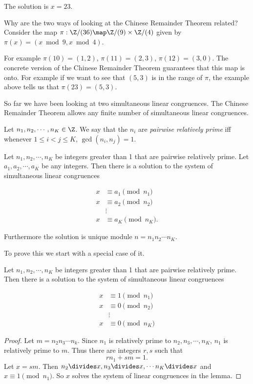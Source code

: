 \documentclass[oneside,12pt]{amsart}
\begin{document}
The solution is $x=23$.

\bigskip

Why are the two ways of looking at the Chinese Remainder Theorem related? Consider
the map $\pi:\Z/(36) \map \Z/(9)\times\Z/(4)$ given by $\pi(x) = \left(x\bmod 9, x\bmod 4 \right)$.

For example $\pi(10) = (1,2)$, $\pi(11) = (2,3)$, $\pi(12) = (3, 0)$. The concrete version of the
Chinese Remainder Theorem guarantees that this map is onto. For example if we want to see that
$(5,3)$ is in the range of $\pi$, the example above tells us that $\pi(23) = (5,3)$.

\bigskip

So far we have been looking at two simultaneous linear congruences.
The Chinese Remainder Theorem allows any finite number of simultaneous linear congruences.

\begin{definition}
Let $n_1,n_2,\cdots,n_K\in\Z$. We say that the $n_i$ are \emph{pairwise relatively prime}
iff whenever $1\leq i < j \leq K$, $\gcd(n_i,n_j) = 1$.
\end{definition}

\begin{theorem} Let $n_1,n_2,\cdots,n_K$ be integers greater
than 1 that are pairwise relatively prime. Let $a_1,a_2,\cdots,a_K$ be any integers. Then there is a solution to the
system of simultaneous linear congruences

\begin{align*}
x &\equiv a_1 \pmod{n_1} \\
x &\equiv a_2 \pmod{n_2} \\
  &\vdots \\
x &\equiv a_K \pmod{n_K}.
\end{align*}

Furthermore the solution is unique module $n=n_1 n_2 \cdots n_K$.

\end{theorem}

To prove this we start with a special case of it.

\begin{lemma} Let $n_1,n_2,\cdots,n_K$ be integers greater
than 1 that are pairwise relatively prime. Then there is a solution to the
system of simultaneous linear congruences

\begin{align*}
x &\equiv 1 \pmod{n_1} \\
x &\equiv 0 \pmod{n_2} \\
  &\vdots \\
x &\equiv 0 \pmod{n_K}
\end{align*}

\end{lemma}
\begin{proof}
Let $m = n_2 n_3 \cdots n_k$. Since $n_1$ is relatively prime to $n_2, n_3,\cdots, n_K$,
$n_1$ is relatively prime to $m$. Thus there are integers $r,s$ such that
$$r n_1 + s m = 1.$$
Let $x=sm$. Then $n_2\divides x, n_3\divides x, \cdots n_K \divides x$ and 
$x\equiv 1 \pmod{n_1}$. So $x$ solves the system of linear congruences in the lemma.
\end{proof}
\end{document}

